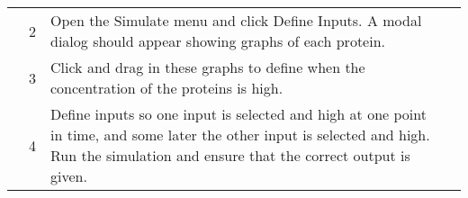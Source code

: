 \documentclass{article}
\begin{document}
\begin{center}
\begin{longtable}{r r  p{} l }
&2& Open the Simulate menu and click Define Inputs. A modal dialog should appear showing graphs of each protein.\\
&3& Click and drag in these graphs to define when the concentration of the proteins is high.\\
&4& Define inputs so one input is selected and high at one point in time, and some later the other input is selected and high. Run the simulation and ensure that the correct output is given. \\

\end{longtable}
\end{center}

\newpage
\end{document}
